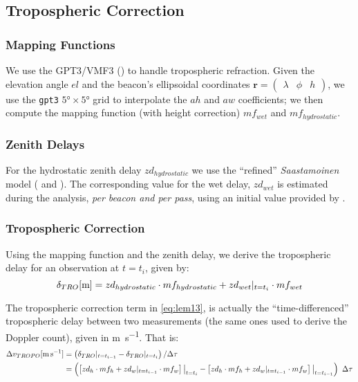 \subsection{Tropospheric Correction}
\label{ssec-tropospheric-correction}

\subsubsection{Mapping Functions}
We use the GPT3/VMF3 (\cite{Landskron2018}) to handle tropospheric refraction. 
Given the elevation angle $el$ and the beacon's ellipsoidal coordinates 
$\bm{r}=\begin{pmatrix} \lambda & \phi & h\end{pmatrix}$, we use the \texttt{gpt3} 
$\ang{5} \times \ang{5}$ grid to interpolate the $ah$ and $aw$ coefficients; 
we then compute the mapping function (with height correction) $mf_{wet}$ and 
$mf_{hydrostatic}$.

\subsubsection{Zenith Delays}
For the hydrostatic zenith delay $zd_{hydrostatic}$ we use the ``refined'' 
\emph{Saastamoinen} model (\cite{Davisetal85} and \cite{Saastamoinen72}). 
The corresponding value for the wet delay, $zd_{wet}$ is estimated during the 
analysis, \emph{per beacon and per pass}, using an initial value provided by 
\cite{Askneetal87}.

\subsubsection{Tropospheric Correction}
Using the mapping function and the zenith delay, we derive the tropospheric 
delay for an observation at $t=t_i$, given by:
\begin{equation}
  \delta _{TRO} [\si{\m}] = zd_{hydrostatic} \cdot mf_{hydrostatic} + zd_{wet}\at{t=t_i} \cdot mf_{wet}
  \label{eq:tropo-delay}
\end{equation}

The tropospheric correction term in \ref{eq:lem13}, is actually the ``time-differenced'' 
tropospheric delay between two measurements (the same ones used to derive the 
Doppler count), given in \si{\m \per \s}. That is:
\begin{equation}
  \begin{aligned}
    \Delta v_{TROPO} [\si{\m \per \s}] 
      &= \left( \delta _{TRO} \at{t=t_{i-1}} - \delta _{TRO} \at{t=t_{i}} \right) / \Delta \tau\\
      &= \left( \left[ zd_{h} \cdot mf_{h} + zd_{w}\at{t=t_{i-1}} \cdot mf_{w} \right]\at[\big]{t=t_i} - 
        \left[ zd_{h} \cdot mf_{h} + zd_{w}\at{t=t_{i-1}} \cdot mf_{w} \right]\at[\big]{t=t_{i-1}} \right) \ \Delta \tau
    \label{eq:dtrop-diff}
  \end{aligned}
\end{equation}

